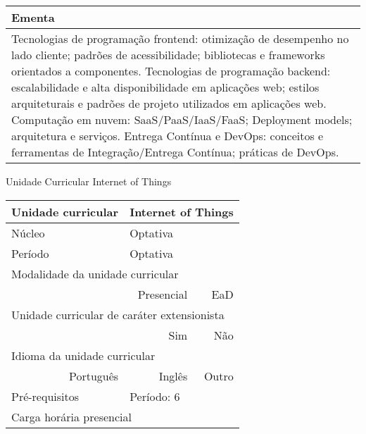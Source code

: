 \begin{quadro}[h!]
\begin{tabular}{|p{3cm} p{2cm} p{3cm} p{2cm} p{3cm} p{2cm}|}
\multicolumn{6}{|p{15cm}|}{\cellcolor{blue1} Ementa} \\\hline
\hline\multicolumn{6}{|p{15cm}|}{\scriptsize Tecnologias de programação frontend: otimização de desempenho no lado cliente; padrões de acessibilidade; bibliotecas e frameworks orientados a componentes. Tecnologias de programação backend: escalabilidade e alta disponibilidade em aplicações web; estilos arquiteturais e padrões de projeto utilizados em aplicações web. Computação em nuvem: SaaS/PaaS/IaaS/FaaS; Deployment models; arquitetura e serviços. Entrega Contínua e DevOps: conceitos e ferramentas de Integração/Entrega Contínua; práticas de DevOps.}\\\hline
\hline
	\end{tabular}
\end{quadro}
\begin{quadro}[h!]
  \centering\scriptsize
\caption{Unidade Curricular Internet of Things}
\label{ unit_53 }
\begin{tabular}{|p{3cm} p{2cm} p{3cm} p{2cm} p{3cm} p{2cm}|}\hline
\multicolumn{1}{|p{3cm}|}{\cellcolor{blue1} Unidade curricular} & \multicolumn{5}{p{9cm}|}{ Internet of Things }\\\hline
\multicolumn{1}{|p{3cm}|}{\cellcolor{blue1} Núcleo} & \multicolumn{5}{p{11.5cm}|}{ Optativa }\\\hline
\multicolumn{1}{|p{3cm}|}{\cellcolor{blue1} Período} & \multicolumn{5}{p{9cm}|}{ Optativa }\\\hline
\multicolumn{6}{|p{15cm}|}{\cellcolor{blue1} Modalidade da unidade curricular} \\\hline
\multicolumn{2}{|r}{		} &  \multicolumn{2}{r}{Presencial \Square } & \multicolumn{2}{r|}{EaD \XBox	} \\\hline
\multicolumn{6}{|p{15cm}|}{\cellcolor{blue1} Unidade curricular de caráter extensionista} \\\hline
\multicolumn{4}{|r}{			Sim \Square	} & \multicolumn{2}{r|}{	Não \XBox	}\\\hline
\multicolumn{6}{|p{15cm}|}{\cellcolor{blue1} Idioma da unidade curricular} \\ \hline
\multicolumn{2}{|r}{	Português \XBox	} &  \multicolumn{2}{r}{	Inglês \Square	} & \multicolumn{2}{r|}{	Outro \Square	} \\ \hline
\multicolumn{1}{|p{3cm}|}{\cellcolor{blue1} Pré-requisitos} & \multicolumn{5}{p{9cm}|}{ Período: 6 }\\ \hline
\multicolumn{6}{|p{15cm}|}{\cellcolor{blue1} Carga horária presencial} \\ \hline

\end{tabular}
\end{quadro}

